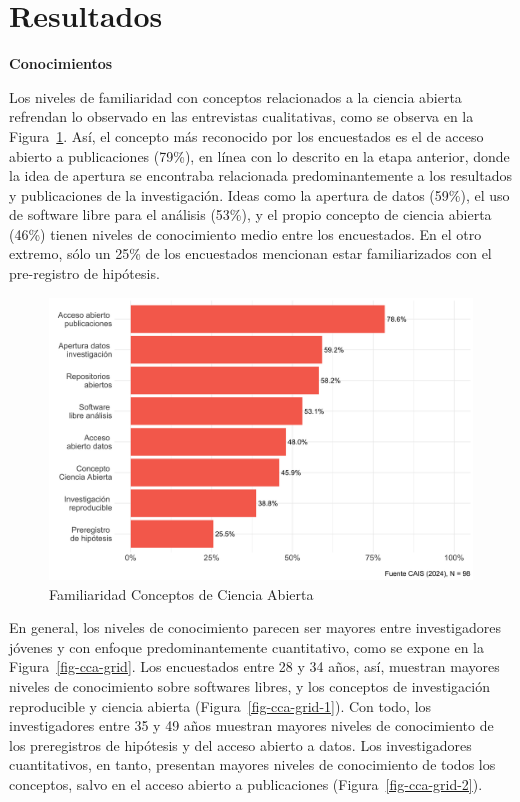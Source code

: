 \documentclass[
  letterpaper,
  DIV=11,
  numbers=noendperiod]{scrreprt}
\begin{document}
\hypertarget{resultados-1}{%
\section{Resultados}\label{resultados-1}}

\textbf{Conocimientos}

Los niveles de familiaridad con conceptos relacionados a la ciencia
abierta refrendan lo observado en las entrevistas cualitativas, como se
observa en la Figura~\ref{fig-cca}. Así, el concepto más reconocido por
los encuestados es el de acceso abierto a publicaciones (79\%), en línea
con lo descrito en la etapa anterior, donde la idea de apertura se
encontraba relacionada predominantemente a los resultados y
publicaciones de la investigación. Ideas como la apertura de datos
(59\%), el uso de software libre para el análisis (53\%), y el propio
concepto de ciencia abierta (46\%) tienen niveles de conocimiento medio
entre los encuestados. En el otro extremo, sólo un 25\% de los
encuestados mencionan estar familiarizados con el pre-registro de
hipótesis.

\begin{figure}

{\centering \includegraphics{paper_files/figure-pdf/fig-cca-1.png}

}

\caption{\label{fig-cca}Familiaridad Conceptos de Ciencia Abierta}

\end{figure}

En general, los niveles de conocimiento parecen ser mayores entre
investigadores jóvenes y con enfoque predominantemente cuantitativo,
como se expone en la Figura~\ref{fig-cca-grid}. Los encuestados entre 28
y 34 años, así, muestran mayores niveles de conocimiento sobre softwares
libres, y los conceptos de investigación reproducible y ciencia abierta
(Figura~\ref{fig-cca-grid-1}). Con todo, los investigadores entre 35 y
49 años muestran mayores niveles de conocimiento de los preregistros de
hipótesis y del acceso abierto a datos. Los investigadores
cuantitativos, en tanto, presentan mayores niveles de conocimiento de
todos los conceptos, salvo en el acceso abierto a publicaciones
(Figura~\ref{fig-cca-grid-2}).
\end{document}
